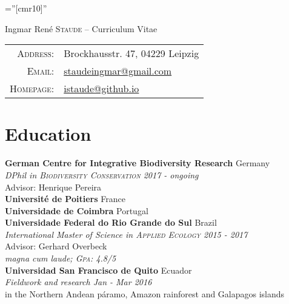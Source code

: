 \documentclass[a4paper,11pt]{article} %
\begin{document}
\pagestyle{empty} %

\font\fb=''[cmr10]'' %


\par{{\Large Ingmar René \textsc{Staude}  -- Curriculum Vitae}\bigskip\par} %
\begin{tabular}{rl}
\textsc{Address:} & Brockhausstr. 47, 04229 Leipzig\\
\textsc{Email:} & \href{mailto:staudeingmar@gmail.com}{staudeingmar@gmail.com}\\

\textsc{Homepage:} & \href{istaude@github.io}{istaude@github.io}\
\end{tabular}

\section{Education}


\textbf{German Centre for Integrative Biodiversity Research}  \hfill Germany\\
\textit{DPhil in \textsc{Biodiversity Conservation} \hfill 2017 - ongoing}\\
\small Advisor: Henrique Pereira\normalsize\ \\

 \textbf{Université de Poitiers} \hfill France \\
\textbf{Universidade de Coimbra} \hfill Portugal\\
\textbf{Universidade Federal do Rio Grande do Sul} \hfill Brazil\\
\textit{International Master of Science in \textsc{Applied Ecology} \hfill 2015 - 2017}\\
\small Advisor: Gerhard Overbeck \\
\textit{magna cum laude; \textsc{Gpa}: 4.8/5}\normalsize \\

\textbf{Universidad San Francisco de Quito} \hfill Ecuador \\
\textit{Fieldwork and research \hfill Jan - Mar 2016}  \\
\small{in the Northern Andean páramo, Amazon rainforest and Galapagos islands}\normalsize  \\
\end{document}
